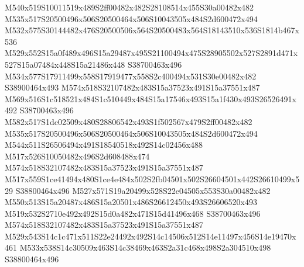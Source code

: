 \documentclass{article}
\begin{document}
\begin{multicols}{2}










M540x519S10011519x489S2ff00482x482S28108514x455S30a00482x482 M535x517S20500496x506S20500464x506S10043505x484S2d600472x494 M532x575S30144482x476S20500506x564S20500483x564S18143510x536S1814b467x536 M529x552S15a0f489x496S15a29487x495S21100494x475S28905502x527S2891d471x527S15a07484x448S15a21486x448 S38700463x496 M534x577S17911499x558S17919477x558S2c400494x531S30e00482x482 S38900464x493 M574x518S32107482x483S15a37523x491S15a37551x487 M569x516S1c518521x484S1c510449x484S15a17546x493S15a1f430x493S26526491x492 S38700463x496 M582x517S1dc02509x480S28806542x493S1f502567x479S2ff00482x482 M535x517S20500496x506S20500464x506S10043505x484S2d600472x494 M544x511S26506494x491S18540518x492S14c02456x488 M517x526S10050482x496S2d608488x474 M574x518S32107482x483S15a37523x491S15a37551x487 M517x559S1ce41494x480S1ce4e484x502S2fb04501x502S26604501x442S26610499x529 S38800464x496 M527x571S19a20499x528S22e04505x553S30a00482x482 M550x513S15a20487x486S15a20501x486S26612450x493S26606520x493 M519x532S2710e492x492S15d0a482x471S15d41496x468 S38700463x496 M574x518S32107482x483S15a37523x491S15a37551x487 M529x543S14c1c471x511S22e24492x492S14c14506x512S14e11497x456S14e19470x461 M533x538S14c30509x463S14c38469x463S2a31c468x498S2a304510x498 S38800464x496


\end{multicols}
\end{document}
